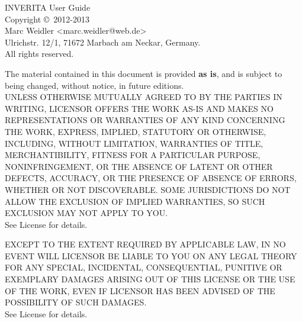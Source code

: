%
%
%
%


INVERITA User Guide \version\\
Copyright \copyright\ 2012-2013\\
Marc Weidler <marc.weidler@web.de>\\
Ulrichstr. 12/1, 71672 Marbach am Neckar, Germany.\\
All rights reserved.

The material contained in this document is provided \textbf{as is}, and is subject to being changed,
without notice, in future editions.\\
UNLESS OTHERWISE MUTUALLY AGREED TO BY THE PARTIES IN WRITING, LICENSOR OFFERS THE WORK AS-IS AND MAKES NO REPRESENTATIONS OR WARRANTIES OF ANY KIND CONCERNING THE WORK, EXPRESS, IMPLIED, STATUTORY OR OTHERWISE, INCLUDING, WITHOUT LIMITATION, WARRANTIES OF TITLE, MERCHANTIBILITY, FITNESS FOR A PARTICULAR PURPOSE, NONINFRINGEMENT, OR THE ABSENCE OF LATENT OR OTHER DEFECTS, ACCURACY, OR THE PRESENCE OF ABSENCE OF ERRORS, WHETHER OR NOT DISCOVERABLE. SOME JURISDICTIONS DO NOT ALLOW THE EXCLUSION OF IMPLIED WARRANTIES, SO SUCH EXCLUSION MAY NOT APPLY TO YOU.\\
See License for details.

EXCEPT TO THE EXTENT REQUIRED BY APPLICABLE LAW, IN NO EVENT WILL LICENSOR BE LIABLE TO YOU ON ANY LEGAL THEORY FOR ANY SPECIAL, INCIDENTAL, CONSEQUENTIAL, PUNITIVE OR EXEMPLARY DAMAGES ARISING OUT OF THIS LICENSE OR THE USE OF THE WORK, EVEN IF LICENSOR HAS BEEN ADVISED OF THE POSSIBILITY OF SUCH DAMAGES.\\
See License for details.

